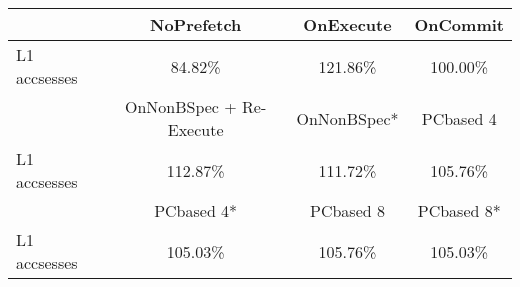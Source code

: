 \begin{tabular}{ l|ccc }
 & NoPrefetch & OnExecute & OnCommit\\ \hline
L1 accsesses & 84.82\% & 121.86\% & 100.00\%\\ \hline
\hline
 & OnNonBSpec + Re-Execute & OnNonBSpec* & PCbased 4\\ \hline
L1 accsesses & 112.87\% & 111.72\% & 105.76\%\\ \hline
\hline
 & PCbased 4* & PCbased 8 & PCbased 8*\\ \hline
L1 accsesses & 105.03\% & 105.76\% & 105.03\%\\ \hline
\end{tabular}

